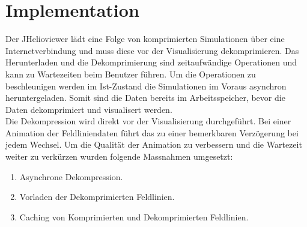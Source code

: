 \section{Implementation}
Der JHelioviewer lädt eine Folge von komprimierten Simulationen über eine Internetverbindung und muss diese vor der Visualisierung dekomprimieren. Das Herunterladen und die Dekomprimierung sind zeitaufwändige Operationen und kann zu Wartezeiten beim Benutzer führen. Um die Operationen zu beschleunigen werden im Ist-Zustand die Simulationen im Voraus asynchron heruntergeladen. Somit sind die Daten bereits im Arbeitsspeicher, bevor die Daten dekomprimiert und visualisert werden.\\
Die Dekompression wird direkt vor der Visualisierung durchgeführt. Bei einer Animation der Feldliniendaten führt das zu einer bemerkbaren Verzögerung bei jedem Wechsel. Um die Qualität der Animation zu verbessern und die Wartezeit weiter zu verkürzen wurden folgende Massnahmen umgesetzt:
\begin{enumerate}
	\item Asynchrone Dekompression.
	\item Vorladen der Dekomprimierten Feldlinien.
	\item Caching von Komprimierten und Dekomprimierten Feldlinien.
\end{enumerate}

